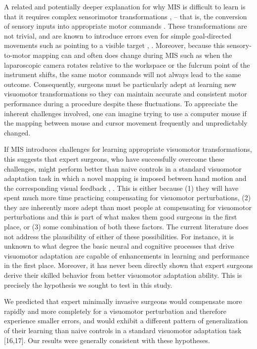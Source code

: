 \documentclass[jou, 11pt, longtable, floatsintext, notab]{apa6}
\begin{document}
A related and potentially deeper explanation for why MIS is
difficult to learn is that it requires complex sensorimotor
transformations \cite{prinz_action_2013},
\cite{prinz_tool_2013} -- that is, the conversion of sensory
inputs into appropriate motor commands
\cite{pouget_computational_2000}. These transformations are
not trivial, and are known to introduce errors even for
simple goal-directed movements such as pointing to a visible
target \cite{soechting_errors_1989},
\cite{sober_flexible_2005}. Moreover, because this
sensory-to-motor mapping can and often does change during
MIS such as when the laparoscopic camera rotates relative to
the workspace or the fulcrum point of the instrument shifts,
the same motor commands will not always lead to the same
outcome. Consequently, surgeons must be particularly adept
at learning new visuomotor transformations so they can
maintain accurate and consistent motor performance during a
procedure despite these fluctuations. To appreciate the
inherent challenges involved, one can imagine trying to use
a computer mouse if the mapping between mouse and cursor
movement frequently and unpredictably changed.

If MIS introduces challenges for learning appropriate
visuomotor transformations, this suggests that expert
surgeons, who have successfully overcome these challenges,
might perform better than naive controls in a standard
visuomotor adaptation task in which a novel mapping is
imposed between hand motion and the corresponding visual
feedback \cite{cunningham_aiming_1989},
\cite{sternad_motor_2009}. This is either because (1) they
will have spent much more time practicing compensating for
visuomotor perturbations, (2) they are inherently more adept
than most people at compensating for visuomotor
perturbations and this is part of what makes them good
surgeons in the first place, or (3) some combination of both
these factors. The current literature does not address the
plausibility of either of these possibilities. For instance,
it is unknown to what degree the basic neural and cognitive
processes that drive visuomotor adaptation are capable of
enhancements in learning and performance in the first place.
Moreover, it has never been directly shown that expert
surgeons derive their skilled behavior from better
visuomotor adaptation ability. This is precisely the
hypothesis we sought to test in this study.

We predicted that expert minimally invasive surgeons would
compensate more rapidly and more completely for a visuomotor
perturbation and therefore experience smaller errors, and
would exhibit a different pattern of generalization of their
learning than naive controls in a standard visuomotor
adaptation task [16,17]. Our results were generally
consistent with these hypotheses.
\end{document}
